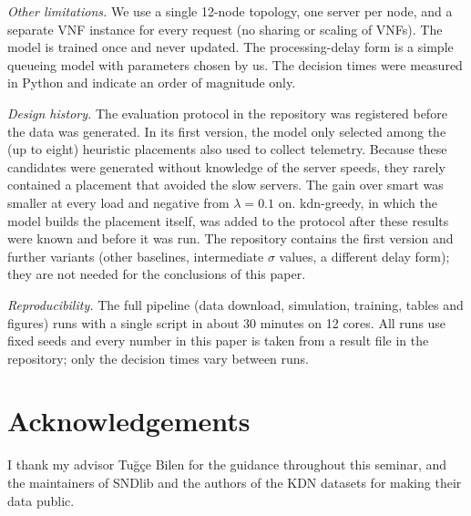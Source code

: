 \documentclass[conference,a4paper]{IEEEtran}
\begin{document}
\emph{Other limitations.} We use a single 12-node topology, one server per node, and a separate VNF instance for every
request (no sharing or scaling of VNFs). The model is trained once and never updated. The processing-delay form is
a simple queueing model with parameters chosen by us. The decision times were measured in Python and indicate an
order of magnitude only.

\emph{Design history.} The evaluation protocol in the repository was registered before the data was generated. In its
first version, the model only selected among the (up to eight) heuristic placements also used to collect telemetry. Because these candidates were
generated without knowledge of the server speeds, they rarely contained a placement that avoided the slow servers.
The gain over smart was smaller at every load and negative from $\lambda = 0.1$ on. kdn-greedy, in which the model builds the placement itself, was
added to the protocol after these results were known and before it was run. The repository contains the first
version and further variants (other baselines, intermediate $\sigma$ values, a different delay form); they are not
needed for the conclusions of this paper.

\emph{Reproducibility.} The full pipeline (data download, simulation, training, tables and figures) runs with a
single script in about 30 minutes on 12 cores. All runs use fixed seeds and every number in this paper is taken from
a result file in the repository; only the decision times vary between runs.

\section*{Acknowledgements}
I thank my advisor Tu\u{g}\c{c}e Bilen for the guidance throughout this seminar, and the maintainers of SNDlib and
the authors of the KDN datasets for making their data public.



\end{document}
